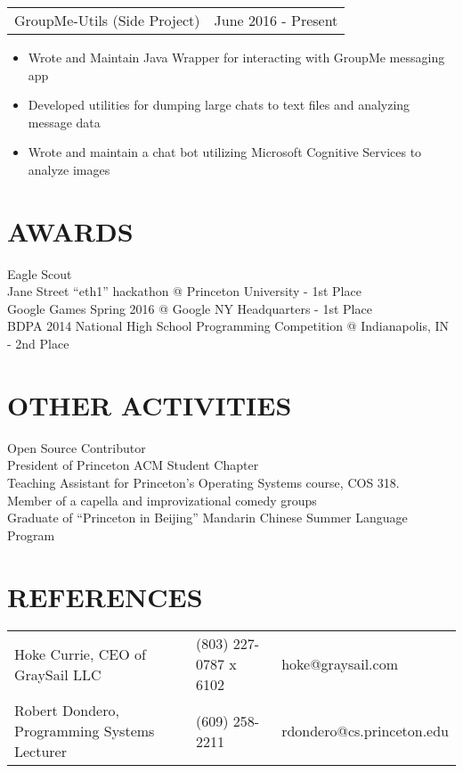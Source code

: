 \documentclass[margin]{res}
\begin{document}
\begin{resume}
    \begin{tabular}{p{3.5in} p{3in}}
        GroupMe-Utils (Side Project) & June 2016 - Present
    \end{tabular}
    \begin{itemize} \itemsep -2pt
        \item Wrote and Maintain Java Wrapper for interacting with GroupMe messaging app
        \item Developed utilities for dumping large chats to text files and analyzing message data
        \item Wrote and maintain a chat bot utilizing Microsoft Cognitive Services to analyze images
    \end{itemize}
\section{AWARDS}
            Eagle Scout \\
            Jane Street ``eth1'' hackathon @ Princeton University - 1st Place \\
            Google Games Spring 2016 @ Google NY Headquarters - 1st Place \\
            BDPA 2014 National High School Programming Competition @ Indianapolis, IN - 2nd Place

\section{OTHER ACTIVITIES}
            Open Source Contributor \\
            President of Princeton ACM Student Chapter\\
            Teaching Assistant for Princeton's Operating Systems course, COS 318.\\
            Member of a capella and improvizational comedy groups\\
            Graduate of ``Princeton in Beijing'' Mandarin Chinese Summer Language Program

\section{REFERENCES}
    \hspace*{-.40in}
    \begin{tabular}{p{2.75in} p{1.25in} p{2in}}
            Hoke Currie, CEO of GraySail LLC & (803) 227-0787 x 6102 & hoke@graysail.com \\
            Robert Dondero, Programming Systems Lecturer & (609) 258-2211 & rdondero@cs.princeton.edu
    \end{tabular}
 

 
\end{resume} 
\end{document}
